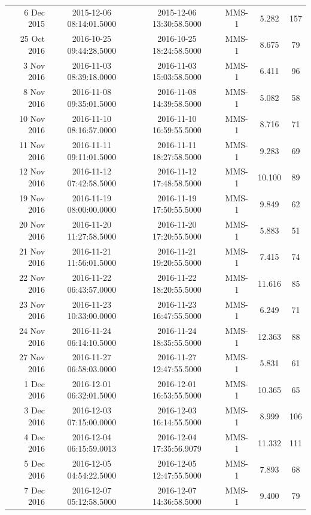 \begin{longtable}{r|ccccc}
6 Dec 2015     &  2015-12-06 08:14:01.5000 &  2015-12-06 13:30:58.5000 &  MMS-1 &    5.282 &    157 \\
25 Oct 2016    &  2016-10-25 09:44:28.5000 &  2016-10-25 18:24:58.5000 &  MMS-1 &    8.675 &     79 \\
3 Nov 2016     &  2016-11-03 08:39:18.0000 &  2016-11-03 15:03:58.5000 &  MMS-1 &    6.411 &     96 \\
8 Nov 2016     &  2016-11-08 09:35:01.5000 &  2016-11-08 14:39:58.5000 &  MMS-1 &    5.082 &     58 \\
10 Nov 2016    &  2016-11-10 08:16:57.0000 &  2016-11-10 16:59:55.5000 &  MMS-1 &    8.716 &     71 \\
11 Nov 2016    &  2016-11-11 09:11:01.5000 &  2016-11-11 18:27:58.5000 &  MMS-1 &    9.283 &     69 \\
12 Nov 2016    &  2016-11-12 07:42:58.5000 &  2016-11-12 17:48:58.5000 &  MMS-1 &   10.100 &     89 \\
19 Nov 2016    &  2016-11-19 08:00:00.0000 &  2016-11-19 17:50:55.5000 &  MMS-1 &    9.849 &     62 \\
20 Nov 2016    &  2016-11-20 11:27:58.5000 &  2016-11-20 17:20:55.5000 &  MMS-1 &    5.883 &     51 \\
21 Nov 2016    &  2016-11-21 11:56:01.5000 &  2016-11-21 19:20:55.5000 &  MMS-1 &    7.415 &     74 \\
22 Nov 2016    &  2016-11-22 06:43:57.0000 &  2016-11-22 18:20:55.5000 &  MMS-1 &   11.616 &     85 \\
23 Nov 2016    &  2016-11-23 10:33:00.0000 &  2016-11-23 16:47:55.5000 &  MMS-1 &    6.249 &     71 \\
24 Nov 2016    &  2016-11-24 06:14:10.5000 &  2016-11-24 18:35:55.5000 &  MMS-1 &   12.363 &     88 \\
27 Nov 2016    &  2016-11-27 06:58:03.0000 &  2016-11-27 12:47:55.5000 &  MMS-1 &    5.831 &     61 \\
1 Dec 2016     &  2016-12-01 06:32:01.5000 &  2016-12-01 16:53:55.5000 &  MMS-1 &   10.365 &     65 \\
3 Dec 2016     &  2016-12-03 07:15:00.0000 &  2016-12-03 16:14:55.5000 &  MMS-1 &    8.999 &    106 \\
4 Dec 2016     &  2016-12-04 06:15:59.0013 &  2016-12-04 17:35:56.9079 &  MMS-1 &   11.332 &    111 \\
5 Dec 2016     &  2016-12-05 04:54:22.5000 &  2016-12-05 12:47:55.5000 &  MMS-1 &    7.893 &     68 \\
7 Dec 2016     &  2016-12-07 05:12:58.5000 &  2016-12-07 14:36:58.5000 &  MMS-1 &    9.400 &     79 \\

\end{longtable}
